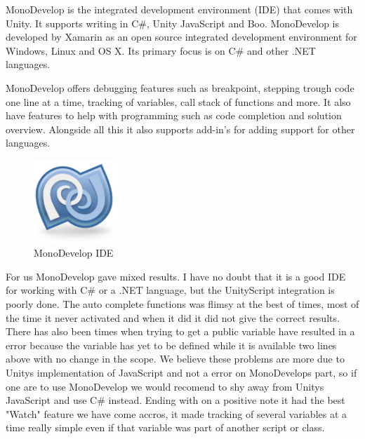 MonoDevelop is the integrated development environment (IDE) that comes with Unity. It supports writing in C\#, Unity JavaScript and Boo.
MonoDevelop is developed by Xamarin \cite{xamarinRef} as an open source integrated development environment for Windows, Linux and OS X.
Its primary focus is on C\# and other .NET languages.


MonoDevelop offers debugging features such as breakpoint, stepping trough code one line at a time, tracking of variables, call stack of functions and more.
It also have features to help with programming such as code completion and solution overview. Alongside all this it also supports add-in's for adding support for other languages.


\begin{figure}
	\capstart
	\centering
	\vspace{-10pt}
	\includegraphics[width=0.28\textwidth]{images/MonoDevelopLogo.png}
	\vspace{-20pt}
	\caption[MonoDevelop IDE Logo]{{M}ono{D}evelop {IDE}}
	\label{fig:monodevelop}
	\vspace{-10px}
\end{figure}

For us MonoDevelop gave mixed results. 
I have no doubt that it is a good IDE for working with C\# or a .NET language, but the UnityScript integration is poorly done.
The auto complete functions was flimsy at the best of times, most of the time it never activated and when it did it did not give the correct results. 
There has also been times when trying to get a public variable have resulted in a error because the variable has yet to be defined while it is available two lines above with no change in the scope.
We believe these problems are more due to Unitys implementation of JavaScript and not a error on MonoDevelops part, so if one are to use MonoDevelop we would recomend to shy away from Unitys JavaScript and use C\# instead.
Ending with on a positive note it had the best "Watch" feature we have come accros, it made tracking of several variables at a time really simple even if that variable was part of another script or class.	

